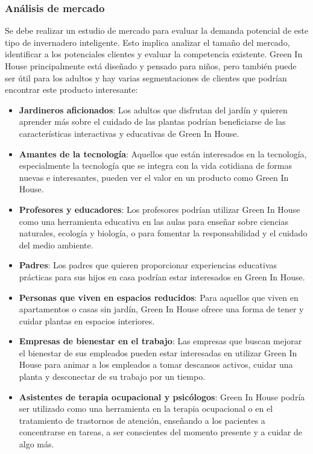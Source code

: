         \subsubsection{Análisis de mercado}
        Se debe realizar un estudio de mercado para evaluar la demanda potencial de este tipo de invernadero inteligente. Esto implica analizar el tamaño del mercado, identificar a los potenciales clientes y evaluar la competencia existente.
            Green In House principalmente está diseñado y pensado para niños, pero también puede ser útil para los adultos y hay varias segmentaciones de clientes que podrían encontrar este producto interesante:
            \begin{itemize}      
                \item \textbf{Jardineros aficionados}: Los adultos que disfrutan del jardín y quieren aprender más sobre el cuidado de las plantas podrían beneficiarse de las características interactivas y educativas de Green In House.
                \item \textbf{Amantes de la tecnología}: Aquellos que están interesados en la tecnología, especialmente la tecnología que se integra con la vida cotidiana de formas nuevas e interesantes, pueden ver el valor en un producto como Green In House.
                \item \textbf{Profesores y educadores}: Los profesores podrían utilizar Green In House como una herramienta educativa en las aulas para enseñar sobre ciencias naturales, ecología y biología, o para fomentar la responsabilidad y el cuidado del medio ambiente.
                \item \textbf{Padres}: Los padres que quieren proporcionar experiencias educativas prácticas para sus hijos en casa podrían estar interesados en Green In House.
                \item \textbf{Personas que viven en espacios reducidos}: Para aquellos que viven en apartamentos o casas sin jardín, Green In House ofrece una forma de tener y cuidar plantas en espacios interiores.
                \item \textbf{Empresas de bienestar en el trabajo}: Las empresas que buscan mejorar el bienestar de sus empleados pueden estar interesadas en utilizar Green In House para animar a los empleados a tomar descansos activos, cuidar una planta y desconectar de su trabajo por un tiempo.
                \item \textbf{Asistentes de terapia ocupacional y psicólogos}: Green In House podría ser utilizado como una herramienta en la terapia ocupacional o en el tratamiento de trastornos de atención, enseñando a los pacientes a concentrarse en tareas, a ser conscientes del momento presente y a cuidar de algo más.
            \end{itemize}
